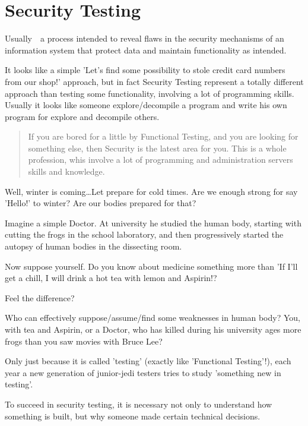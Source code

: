 \section{Security Testing}
\label{sec:Security Testing}


Usually~\textemdash~a process intended to reveal flaws in the security mechanisms of an information system that protect data and maintain functionality as intended.

It looks like a simple 'Let's find some possibility to stole credit card numbers from our shop!' approach, but in fact Security Testing represent a totally different approach than testing some functionality, involving a lot of programming skills. Usually it looks like someone explore/decompile a program and write his own program for explore and decompile others.

\begin{quote}
 If you are bored for a little by Functional Testing, and you are looking for something else, then Security is the latest area for you. This is a whole profession, whis involve a lot of programming and administration servers skills and knowledge.
\end{quote} 

Well, winter is coming\ldots Let prepare for cold times. Are we enough strong for say 'Hello!' to winter? Are our bodies prepared for that?

Imagine a simple Doctor. At university he studied the human body, starting with cutting the frogs in the school laboratory, and then progressively started the autopsy of human bodies in the dissecting room.

Now suppose yourself. Do you know about medicine something more than 'If I'll get a chill, I will drink a hot tea with lemon and Aspirin!?

Feel the difference?

Who can effectively suppose/assume/find some weaknesses in human body? You, with tea and Aspirin, or a Doctor, who has killed during his university ages more frogs than you saw movies with Bruce Lee?

Only just because it is called 'testing' (exactly like 'Functional Testing'!), each year a new generation of junior-jedi testers tries to study 'something new in testing'.

To succeed in security testing, it is necessary not only to understand how something is built, but why someone made certain technical decisions.
